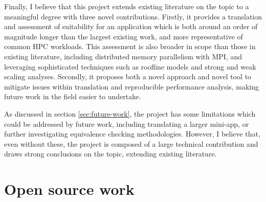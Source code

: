 Finally, I believe that this project extends existing literature on the topic to a meaningful degree with three novel contributions. Firstly, it provides a translation and assessment of suitability for an application which is both around an order of magnitude longer than the largest existing work, and more representative of common \acrshort{HPC} workloads. This assessment is also broader in scope than those in existing literature, including distributed memory parallelism with MPI, and leveraging sophisticated techniques such as roofline models and strong and weak scaling analyses. Secondly, it proposes both a novel approach and novel tool to mitigate issues within translation and reproducible performance analysis, making future work in the field easier to undertake.

As discussed in section \ref{sec:future-work}, the project has some limitations which could be addressed by future work, including translating a larger \acrshort{mini-app}, or further investigating equivalence checking methodologies. However, I believe that, even without these, the project is composed of a large technical contribution and draws strong conclusions on the topic, extending existing literature.



\section{Open source work}
\label{sec:open-source-work}

